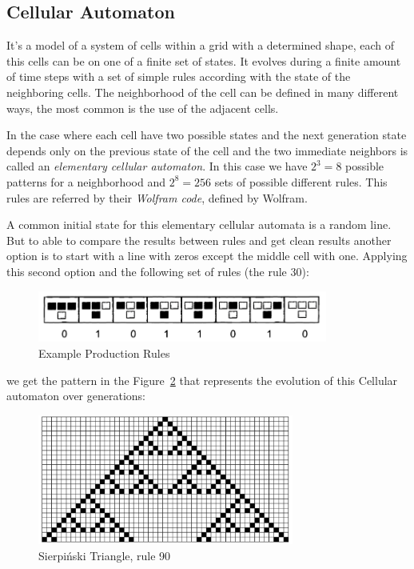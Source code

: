 
\subsection{Cellular Automaton} %
\label{sub:cellular_automaton}

It's a model of a system of cells within a grid with a determined shape, each of this cells can be on one of a finite set of states. It evolves during a finite amount of time steps with a set of simple rules according with the state of the neighboring cells.
The neighborhood of the cell can be defined in many different ways, the most common is the use of the adjacent cells. 

In the case where each cell have two possible states and the next generation state depends only on the previous state of the cell and the two immediate neighbors is called an \emph{elementary cellular automaton}. In this case we have $2^3 = 8$ possible patterns for a neighborhood and $2^8 = 256$ sets of possible different rules. This rules are referred by their \emph{Wolfram code}, defined by Wolfram. 

A common initial state for this elementary cellular automata is a random line. But to able to compare the results between rules and get clean results another option is to start with a line with zeros except the middle cell with one. Applying this second option and the following set of rules (the rule 30):

\begin{figure}[htbp]
	\centering
	\includegraphics[width=0.85\textwidth]{img/Theory/Cellular_A/Rules.png}
	\caption{Example Production Rules\cite{Shiffman2012}}
	\label{fig:label}
\end{figure}

we get the pattern in the Figure~\ref{fig:resultCA} that represents the evolution of this Cellular automaton over generations:

\begin{figure}[H]
    \centering
    \includegraphics[width=0.75\textwidth]{img/Theory/Cellular_A/Result.png}
    \caption{Sierpiński Triangle, rule 90}
    \label{fig:resultCA}
\end{figure}


